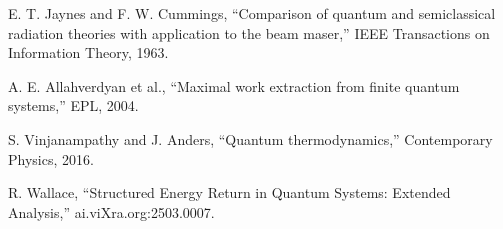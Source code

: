 \documentclass[a4paper,12pt]{article}
\begin{document}
\begin{thebibliography}{9}
 E. T. Jaynes and F. W. Cummings, ``Comparison of quantum and semiclassical radiation theories with application to the beam maser,'' IEEE Transactions on Information Theory, 1963.

 A. E. Allahverdyan et al., ``Maximal work extraction from finite quantum systems,'' EPL, 2004.

 S. Vinjanampathy and J. Anders, ``Quantum thermodynamics,'' Contemporary Physics, 2016.

 R. Wallace, ``Structured Energy Return in Quantum Systems: Extended Analysis,'' ai.viXra.org:2503.0007.
\end{thebibliography}
\end{document}
